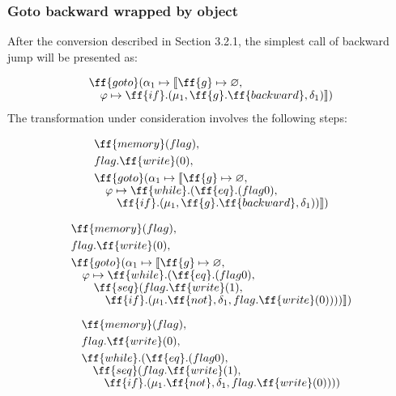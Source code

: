 \documentclass[sigplan,review,11pt,nonacm,natbib=false]{acmart}
\newcommand\br{\\[-4pt]}
\begin{document}
\subsubsection{Goto backward wrapped by object}
After the conversion described in Section 3.2.1, the simplest call of backward jump will be presented as:

\begin{equation}
\begin{split}
& \ff{goto}(\alpha_1 \mapsto \llbracket \ff{g} \mapsto \varnothing, \br
& \quad \varphi \mapsto \ff{if}.( \mu_1, \ff{g}.\ff{backward}, \delta_1 ) \rrbracket) \br
\end{split}
\end{equation}

The transformation under consideration involves the following steps:

\begin{equation}
\begin{split}
& \ff{memory}(flag), \\
& flag.\ff{write}(0), \\
& \ff{goto}(\alpha_1 \mapsto \llbracket \ff{g} \mapsto \varnothing, \br
& \quad \varphi \mapsto \ff{while}.(\ff{eq}.(flag 0), \br
& \quad \quad \ff{if}.( \mu_1, \ff{g}.\ff{backward}, \delta_1 ))\rrbracket) \\[-1pt]
\end{split}
\end{equation}

\begin{equation}
\begin{split}
& \ff{memory}(flag), \\
& flag.\ff{write}(0), \\
& \ff{goto}(\alpha_1 \mapsto \llbracket \ff{g} \mapsto \varnothing, \br
& \quad \varphi \mapsto \ff{while}.(\ff{eq}.(flag 0), \br
& \quad \quad \ff{seq}(flag.\ff{write}(1), \br
& \quad \quad  \quad \ff{if}.( \mu_1.\ff{not}, \delta_1, flag.\ff{write}(0) )))\rrbracket) \\[-1pt]
\end{split}
\end{equation}

\begin{equation}
\begin{split}
& \ff{memory}(flag), \\
& flag.\ff{write}(0), \\
& \ff{while}.(\ff{eq}.(flag 0), \br
& \quad \ff{seq}(flag.\ff{write}(1), \br
& \quad \quad \ff{if}.( \mu_1.\ff{not}, \delta_1, flag.\ff{write}(0) ))) \\[-1pt]
\end{split}
\end{equation}
\end{document}
